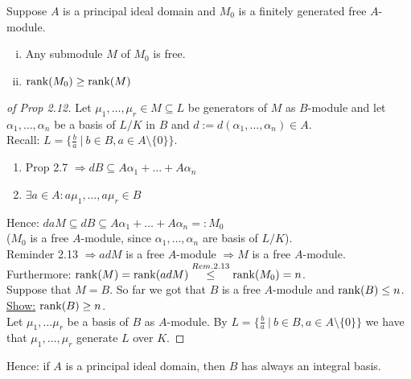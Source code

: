 \begin{remin}
Suppose $A$ is a principal ideal domain and $M_0$ is a finitely generated free $A$-module.
\begin{enumerate}[i)]
\item Any submodule $M$ of $M_0$ is free.
\item $\operatorname{rank}(M_0) \geq \operatorname{rank}(M)$
\end{enumerate}
\end{remin}

\begin{proof}[of Prop 2.12]
Let $\mu_1, \dots, \mu_r \in M \subseteq L$ be generators of $M$ as $B$-module and let $\alpha_1, \dots, \alpha_n$ be a basis of $L/K$ in $B$ and $d:=d(\alpha_1, \dots, \alpha_n) \in A$.\\
Recall: $L = \{ \frac{b}{a} \ | \ b \in B, a \in A \setminus \{0\}\}$.
\begin{enumerate}[(1)]
\item Prop 2.7 $\Rightarrow dB \subseteq A \alpha_1 + \dots + A \alpha_n$
\item $\exists a \in A: a \mu_1, \dots, a \mu_r \in B$
\end{enumerate}
Hence: $daM \subseteq dB \subseteq A \alpha_1 + \dots + A \alpha_n =: M_0 $\\
($M_0$ is a free $A$-module, since $\alpha_1, \dots, \alpha_n$ are basis of $L/K$).\\
Reminder 2.13 $\Rightarrow adM$ is a free $A$-module $\Rightarrow M$ is a free $A$-module.\\ Furthermore: $\operatorname{rank}(M)= \operatorname{rank} (adM) \stackrel{Rem. 2.13}{\leq } \operatorname{rank} (M_0) = n$.\\
Suppose that $M = B$. So far we got that $B$ is a free $A$-module and $\operatorname{rank}(B) \leq n$.\\
\underline{Show:} $\operatorname{rank}(B) \geq n$.\\
Let $\mu_1, \dots \mu_r$ be a basis of $B$ as $A$-module. By $L=\{\frac{b}{a} \ | \ b \in B, a \in A \setminus \{0\}\}$ we have that $\mu_1, \dots, \mu_r$ generate $L$ over $K$.
\end{proof}

Hence: if $A$ is a principal ideal domain, then $B$ has always an integral basis.

